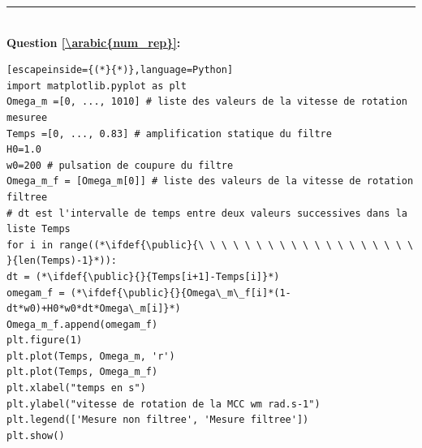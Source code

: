 \noindent
\rule{\linewidth}{.5pt}\\
\textbf{Question \ref{\arabic{num_rep}}:} ~\ \\

\begin{lstlisting}[escapeinside={(*}{*)},language=Python]
import matplotlib.pyplot as plt
Omega_m =[0, ..., 1010] # liste des valeurs de la vitesse de rotation mesuree
Temps =[0, ..., 0.83] # amplification statique du filtre
H0=1.0
w0=200 # pulsation de coupure du filtre
Omega_m_f = [Omega_m[0]] # liste des valeurs de la vitesse de rotation filtree
# dt est l'intervalle de temps entre deux valeurs successives dans la liste Temps
for i in range((*\ifdef{\public}{\ \ \ \ \ \ \ \ \ \ \ \ \ \ \ \ \ \ \ }{len(Temps)-1}*)):
dt = (*\ifdef{\public}{}{Temps[i+1]-Temps[i]}*)
omegam_f = (*\ifdef{\public}{}{Omega\_m\_f[i]*(1-dt*w0)+H0*w0*dt*Omega\_m[i]}*)
Omega_m_f.append(omegam_f)
plt.figure(1)
plt.plot(Temps, Omega_m, 'r')
plt.plot(Temps, Omega_m_f)
plt.xlabel("temps en s")
plt.ylabel("vitesse de rotation de la MCC wm rad.s-1")
plt.legend(['Mesure non filtree', 'Mesure filtree'])
plt.show()
\end{lstlisting}


\ifdef{\public}{\newpage}




